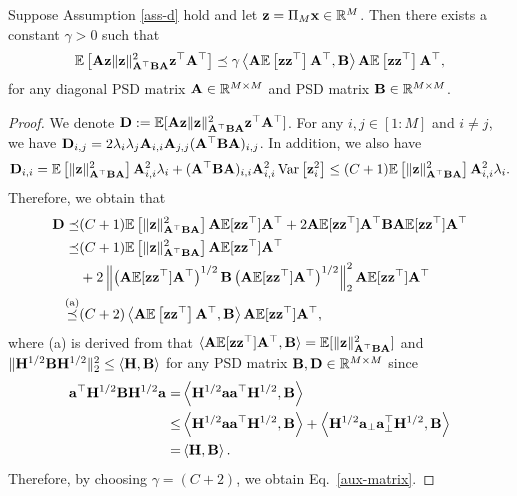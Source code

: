 \begin{lemma}\label{aux-6}
    Suppose Assumption \ref{ass-d} hold and let $\mathbf{z}=\Pi_M\mathbf{x}\in\mathbb{R}^M$. Then there exists a constant $\gamma>0$ such that 
    \begin{align}\label{aux-matrix}
        \mathbb{E}\left[\mathbf{A}\mathbf{z}\|\mathbf{z}\|_{\mathbf{A}^{\top}\mathbf{B}\mathbf{A}}^2\mathbf{z}^{\top}\mathbf{A}^{\top}\right]\preceq\gamma\left\langle\mathbf{A}\mathbb{E}\left[\mathbf{z}\mathbf{z}^{\top}\right]\mathbf{A}^{\top},\mathbf{B}\right\rangle\mathbf{A}\mathbb{E}\left[\mathbf{z}\mathbf{z}^{\top}\right]\mathbf{A}^{\top},
    \end{align}
    for any diagonal PSD matrix $\mathbf{A}\in\mathbb{R}^{M\times M}$ and PSD matrix $\mathbf{B}\in\mathbb{R}^{M\times M}$.
\end{lemma}
\begin{proof}
    We denote $\mathbf{D}:=\mathbb{E}[\mathbf{A}\mathbf{z}\|\mathbf{z}\|_{\mathbf{A}^{\top}\mathbf{B}\mathbf{A}}^2\mathbf{z}^{\top}\mathbf{A}^{\top}]$. For any $i,j\in[1:M]$ and $i\neq j$, we have $\mathbf{D}_{i,j}=2\lambda_i\lambda_j\mathbf{A}_{i,i}\mathbf{A}_{j,j}(\mathbf{A}^{\top}\mathbf{B}\mathbf{A})_{i,j}$. In addition, we also have 
    $$
    \mathbf{D}_{i,i}=\mathbb{E}\left[\|\mathbf{z}\|_{\mathbf{A}^{\top}\mathbf{B}\mathbf{A}}^2\right]\mathbf{A}_{i,i}^2\lambda_i+(\mathbf{A}^{\top}\mathbf{B}\mathbf{A})_{i,i}\mathbf{A}_{i,i}^2\operatorname*{Var}\left[\mathbf{z}_i^2\right]\leq (C+1)\mathbb{E}\left[\|\mathbf{z}\|_{\mathbf{A}^{\top}\mathbf{B}\mathbf{A}}^2\right]\mathbf{A}_{i,i}^2\lambda_i.
    $$
    Therefore, we obtain that
    \begin{align}
        \mathbf{D}\preceq&(C+1)\mathbb{E}\left[\|\mathbf{z}\|_{\mathbf{A}^{\top}\mathbf{B}\mathbf{A}}^2\right]\mathbf{A}\mathbb{E}[\mathbf{z}\mathbf{z}^{\top}]\mathbf{A}^{\top}+2\mathbf{A}\mathbb{E}[\mathbf{z}\mathbf{z}^{\top}]\mathbf{A}^{\top}\mathbf{B}\mathbf{A}\mathbb{E}[\mathbf{z}\mathbf{z}^{\top}]\mathbf{A}^{\top}\notag
        \\
        \preceq&(C+1)\mathbb{E}\left[\|\mathbf{z}\|_{\mathbf{A}^{\top}\mathbf{B}\mathbf{A}}^2\right]\mathbf{A}\mathbb{E}[\mathbf{z}\mathbf{z}^{\top}]\mathbf{A}^{\top}\notag
        \\
        &+2\left\|\left(\mathbf{A}\mathbb{E}[\mathbf{z}\mathbf{z}^{\top}]\mathbf{A}^{\top}\right)^{1/2}\mathbf{B}\left(\mathbf{A}\mathbb{E}[\mathbf{z}\mathbf{z}^{\top}]\mathbf{A}^{\top}\right)^{1/2}\right\|_2^2\mathbf{A}\mathbb{E}[\mathbf{z}\mathbf{z}^{\top}]\mathbf{A}^{\top}\notag
        \\
        \overset{\text{(a)}}{\preceq}&(C+2)\left\langle\mathbf{A}\mathbb{E}\left[\mathbf{z}\mathbf{z}^{\top}\right]\mathbf{A}^{\top},\mathbf{B}\right\rangle\mathbf{A}\mathbb{E}[\mathbf{z}\mathbf{z}^{\top}]\mathbf{A}^{\top},\notag
    \end{align}
    where (a) is derived from that $\langle\mathbf{A}\mathbb{E}[\mathbf{z}\mathbf{z}^{\top}]\mathbf{A}^{\top},\mathbf{B}\rangle=\mathbb{E}[\|\mathbf{z}\|_{\mathbf{A}^{\top}\mathbf{B}\mathbf{A}}^2]$ and $\|\mathbf{H}^{1/2}\mathbf{B}\mathbf{H}^{1/2}\|_2^2\leq\langle\mathbf{H},\mathbf{B}\rangle$ for any PSD matrix $\mathbf{B},\mathbf{D}\in\mathbb{R}^{M\times M}$ since 
    \begin{align}
        \mathbf{a}^{\top}\mathbf{H}^{1/2}\mathbf{B}\mathbf{H}^{1/2}\mathbf{a}=&\left\langle\mathbf{H}^{1/2}\mathbf{a}\mathbf{a}^{\top}\mathbf{H}^{1/2},\mathbf{B}\right\rangle\notag
        \\
        \leq&\left\langle\mathbf{H}^{1/2}\mathbf{a}\mathbf{a}^{\top}\mathbf{H}^{1/2},\mathbf{B}\right\rangle+\left\langle\mathbf{H}^{1/2}\mathbf{a}_{\perp}\mathbf{a}_{\perp}^{\top}\mathbf{H}^{1/2},\mathbf{B}\right\rangle\notag
        \\
        =&\left\langle\mathbf{H},\mathbf{B}\right\rangle.\notag
    \end{align}
    Therefore, by choosing $\gamma=(C+2)$, we obtain Eq.~\eqref{aux-matrix}.
\end{proof}

